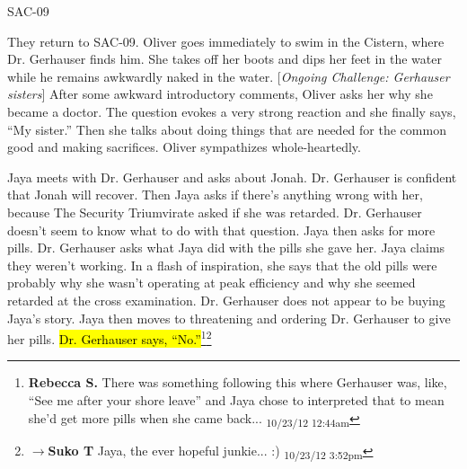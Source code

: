  {\LARGE SAC-09 } 



They return to SAC-09.  Oliver goes immediately to swim in the Cistern, where Dr. Gerhauser finds him.  She takes off her boots and dips her feet in the water while he remains awkwardly naked in the water.  {[}\textit{Ongoing Challenge: Gerhauser sisters}{]}  After some awkward introductory comments, Oliver asks her why she became a doctor.  The question evokes a very strong reaction and she finally says, ``My sister.''  Then she talks about doing things that are needed for the common good and making sacrifices.  Oliver sympathizes whole-heartedly.



Jaya meets with Dr. Gerhauser and asks about Jonah.  Dr. Gerhauser is confident that Jonah will recover.  Then Jaya asks if there's anything wrong with her, because The Security Triumvirate asked if she was retarded.  Dr. Gerhauser doesn't seem to know what to do with that question.  Jaya then asks for more pills.  Dr. Gerhauser asks what Jaya did with the pills she gave her.  Jaya claims they weren't working.  In a flash of inspiration, she says that the old pills were probably why she wasn't operating at peak efficiency and why she seemed retarded at the cross examination.  Dr. Gerhauser does not appear to be buying Jaya's story.  Jaya then moves to threatening and ordering Dr. Gerhauser to give her pills.  \hl{Dr. Gerhauser says, ``No.''}\footnote{\textbf{Rebecca S. }There was something following this where Gerhauser was, like, ``See me after your shore leave'' and Jaya chose to interpreted that to mean she'd get more pills when she came back... \textsubscript{10/23/12 12:44am}}\footnote{$\rightarrow$\textbf{Suko T }Jaya, the ever hopeful junkie... :) \textsubscript{10/23/12 3:52pm}}



